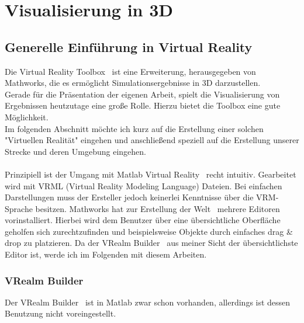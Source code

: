 \chapter{Visualisierung in 3D}

\section{Generelle Einführung in Virtual Reality}
Die \glqq Virtual Reality Toolbox \grqq \ ist eine Erweiterung, herausgegeben von Mathworks, die es ermöglicht Simulationsergebnisse in 3D darzustellen. \\

Gerade für die Präsentation der eigenen Arbeit, spielt die Visualisierung von Ergebnissen heutzutage eine große Rolle. Hierzu bietet die Toolbox eine gute Möglichkeit.\\ 
Im folgenden Abschnitt möchte ich kurz auf die Erstellung einer solchen "Virtuellen Realität" eingehen und anschließend speziell auf die Erstellung unserer Strecke und deren Umgebung eingehen. \\ \\
Prinzipiell ist der Umgang mit   \glqq Matlab Virtual Reality \grqq \
recht intuitiv. Gearbeitet wird mit VRML (Virtual Reality Modeling Language) Dateien. Bei einfachen Darstellungen muss der Ersteller jedoch keinerlei Kenntnisse über die VRM- Sprache  besitzen. 
Mathworks hat zur Erstellung der \glqq Welt \grqq \ mehrere Editoren vorinstalliert. Hierbei wird dem Benutzer über eine übersichtliche Oberfläche geholfen sich zurechtzufinden und beispielsweise Objekte durch einfaches drag \& drop zu platzieren. Da der \glqq VRealm Builder \grqq \ aus meiner Sicht der übersichtlichste Editor ist, werde ich im Folgenden mit diesem Arbeiten. 
\subsection{VRealm Builder}
Der \glqq VRealm Builder \grqq \ ist in Matlab zwar schon vorhanden, allerdings ist dessen Benutzung nicht voreingestellt. 
